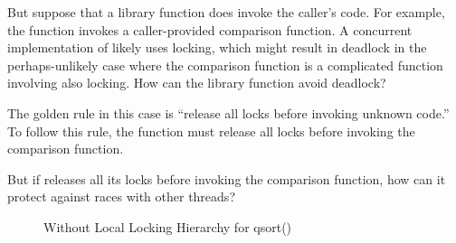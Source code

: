 But suppose that a library function does invoke the caller's code.
For example, the  function invokes a caller-provided
comparison function.
A concurrent implementation of  likely uses locking,
which might result in deadlock in the perhaps-unlikely case where
the comparison function is a
complicated function involving also locking.
How can the library function avoid deadlock?

The golden rule in this case is ``release all locks before invoking
unknown code.''
To follow this rule, the  function must release all
locks before invoking the comparison function.

\QuickQuiz{}
	But if  releases all its locks before invoking
	the comparison function, how can it protect against races
	with other  threads?
 \QuickQuizEnd

\begin{figure}[tb]
\begin{center}
\end{center}
\caption{Without Local Locking Hierarchy for qsort()}
\label{fig:lock:Without Local Locking Hierarchy for qsort()}
\end{figure}

